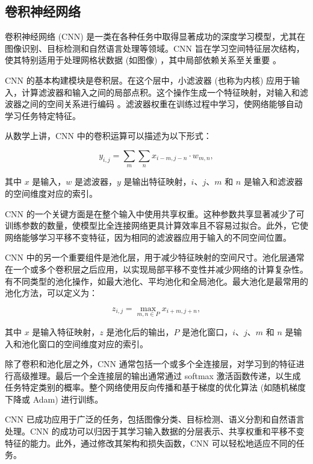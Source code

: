 \subsection{卷积神经网络}
卷积神经网络 (CNN) 是一类在各种任务中取得显著成功的深度学习模型，尤其在图像识别、目标检测和自然语言处理等领域。CNN 旨在学习空间特征层次结构，使其特别适用于处理网格状数据 (如图像) ，其中局部依赖关系至关重要\cite{chua1993cnn} 。

CNN 的基本构建模块是卷积层。在这个层中，小滤波器 (也称为内核) 应用于输入，计算滤波器和输入之间的局部点积。这个操作生成一个特征映射，对输入和滤波器之间的空间关系进行编码\cite{he2016deep} 。滤波器权重在训练过程中学习，使网络能够自动学习任务特定特征。

从数学上讲，CNN 中的卷积运算可以描述为以下形式：

\begin{equation}
  y_{i,j} = \sum_{m} \sum_{n} x_{i-m, j-n} \cdot w_{m,n},
\end{equation}

其中 $x$ 是输入，$w$ 是滤波器，$y$ 是输出特征映射，$i$、$j$、$m$ 和 $n$ 是输入和滤波器的空间维度对应的索引。

CNN 的一个关键方面是在整个输入中使用共享权重。这种参数共享显著减少了可训练参数的数量，使模型比全连接网络更具计算效率且不容易过拟合。此外，它使网络能够学习平移不变特征，因为相同的滤波器应用于输入的不同空间位置。

CNN 中的另一个重要组件是池化层，用于减少特征映射的空间尺寸。池化层通常在一个或多个卷积层之后应用，以实现局部平移不变性并减少网络的计算复杂性。有不同类型的池化操作，如最大池化、平均池化和全局池化。最大池化是最常用的池化方法，可以定义为：

\begin{equation}
  z_{i,j} = \max_{m,n \in P} x_{i+m, j+n},
\end{equation}

其中 $x$ 是输入特征映射，$z$ 是池化后的输出，$P$ 是池化窗口，$i$、$j$、$m$ 和 $n$ 是输入和池化窗口的空间维度对应的索引。

除了卷积和池化层之外，CNN 通常包括一个或多个全连接层，对学习到的特征进行高级推理。最后一个全连接层的输出通常通过 softmax 激活函数传递，以生成任务特定类别的概率。整个网络使用反向传播和基于梯度的优化算法 (如随机梯度下降或 Adam) 进行训练。

CNN 已成功应用于广泛的任务，包括图像分类、目标检测、语义分割和自然语言处理。CNN 的成功可以归因于其学习输入数据的分层表示、共享权重和平移不变特征的能力。此外，通过修改其架构和损失函数，CNN 可以轻松地适应不同的任务\cite{albawi2017understanding}。

